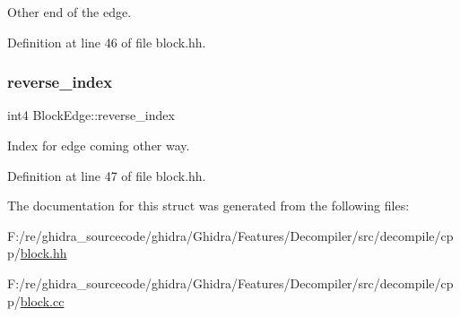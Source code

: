 Other end of the edge. 



Definition at line 46 of file block.\+hh.

\mbox{\label{struct_block_edge_aa4ed5e4c15bd9596cd02347a8c7c9d9f}} 
\subsubsection{\texorpdfstring{reverse\_index}{reverse\_index}}
{\footnotesize\ttfamily int4 Block\+Edge\+::reverse\+\_\+index}



Index for edge coming other way. 



Definition at line 47 of file block.\+hh.



The documentation for this struct was generated from the following files\+:\begin{DoxyCompactItemize}
\item 
F\+:/re/ghidra\+\_\+sourcecode/ghidra/\+Ghidra/\+Features/\+Decompiler/src/decompile/cpp/\mbox{\hyperlink{block_8hh}{block.\+hh}}\item 
F\+:/re/ghidra\+\_\+sourcecode/ghidra/\+Ghidra/\+Features/\+Decompiler/src/decompile/cpp/\mbox{\hyperlink{block_8cc}{block.\+cc}}\end{DoxyCompactItemize}
